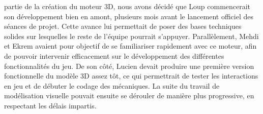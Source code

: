        partie de la création du moteur 3D, nous avons décidé que Loup commencerait son développement bien en amont, plusieurs mois avant le lancement officiel des séances 
        de projet. Cette avance lui permettait de poser des bases techniques solides sur lesquelles le reste de l’équipe pourrait s’appuyer. Parallèlement, Mehdi et Ekrem 
        avaient pour objectif de se familiariser rapidement avec ce moteur, afin de pouvoir intervenir efficacement sur le développement des différentes fonctionnalités du 
        jeu. De son côté, Lucien devait produire une première version fonctionnelle du modèle 3D assez tôt, ce qui permettrait de tester les interactions en jeu et de 
        débuter le codage des mécaniques. La suite du travail de modélisation visuelle pouvait ensuite se dérouler de manière plus progressive, en respectant les délais 
        impartis.



